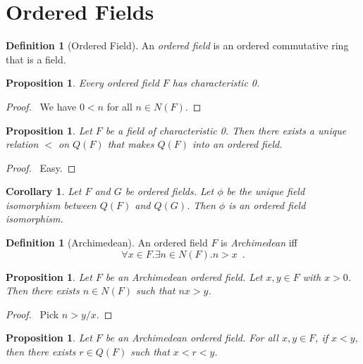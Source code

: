 \documentclass{book}
\let\qed\relax
\newtheorem{prop}[ax]{Proposition}
\newtheorem{cor}{Corollary}[ax]
\theoremstyle{definition}
\newtheorem{df}[ax]{Definition}
\begin{document}
\section{Ordered Fields}

\begin{df}[Ordered Field]
An \emph{ordered field} is an ordered commutative ring that is a field.
\end{df}

\begin{prop}
Every ordered field $F$ has characteristic 0.
\end{prop}

\begin{proof}
\pf\ We have $0 < n$ for all $n \in N(F)$. \qed
\end{proof}

\begin{prop}
Let $F$ be a field of characteristic 0. Then there exists a unique relation $<$ on $Q(F)$ that makes $Q(F)$ into an ordered field.
\end{prop}

\begin{proof}
\pf\ Easy. \qed
\end{proof}

\begin{cor}
\label{cor:isoQs}
Let $F$ and $G$ be ordered fields. Let $\phi$ be the unique field isomorphism between $Q(F)$ and $Q(G)$. Then $\phi$ is an ordered field isomorphism.
\end{cor}

\begin{df}[Archimedean]
An ordered field $F$ is \emph{Archimedean} iff
\[ \forall x \in F. \exists n \in N(F). n > x \enspace . \]
\end{df}

\begin{prop}
\label{prop:Archimedean1}
Let $F$ be an Archimedean ordered field. Let $x,y \in F$ with $x > 0$. Then there exists $n \in N(F)$ such that $nx > y$.
\end{prop}

\begin{proof}
\pf\ Pick $n > y/x$. \qed
\end{proof}

\begin{prop}
\label{prop:Qdense}
Let $F$ be an Archimedean ordered field. For all $x,y \in F$, if $x < y$, then there exists $r \in Q(F)$ such that $x < r < y$.
\end{prop}
\end{document}
